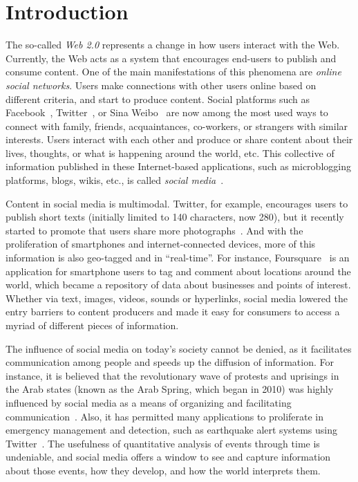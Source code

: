 \chapter{Introduction}


The so-called {\em Web 2.0} represents a change in how users interact with the
Web.
%
Currently, the Web acts as a system that encourages end-users to publish and
consume content. 
%
One of the main manifestations of this phenomena are {\em online social
networks}.
%
Users make connections with other users online based on different criteria, and
start to produce content.
%
Social platforms such as Facebook~\cite{facebook}, Twitter~\cite{twitter},
or Sina Weibo~\cite{weibo} are now among the most used ways to connect with
family, friends, acquaintances, co-workers, or strangers with similar interests.
%
Users interact with each other and produce or share content about their lives,
thoughts, or what is happening around the world, etc.    
%
This collective of information published in these Internet-based applications,
such as microblogging platforms, blogs, wikis, etc., is called {\em
social media}~\cite{kaplan2010users}.


Content in social media is multimodal. 
%
Twitter, for example, encourages users to publish short texts (initially limited
to 140 characters, now 280), but it recently started to promote that users share
more photographs~\cite{brown_2019}.
%  
And with the proliferation of smartphones and internet-connected devices, more
of this information is also geo-tagged and in ``real-time''. 
%
For instance, Foursquare~\cite{foursquare} is an application for smartphone
users to tag and comment about locations around the world, which became a
repository of data about businesses and points of interest.
%
Whether via text, images, videos, sounds or hyperlinks, social media lowered the
entry barriers to content producers and made it easy for consumers to access a
myriad of different pieces of information.





The influence of social media on today's society cannot be denied, as it
facilitates co\-mmu\-nication among people and speeds up the diffusion of
information. 
%
For instance, it is believed that the revolutionary wave of protests and
uprisings in the Arab states (known as the Arab Spring, which began in 2010) was
highly influenced by social media as a means of organizing and facilitating
communication~\cite{howard2011opening}. 
%
Also, it has permitted many applications to proliferate in emergency management
and detection, such as earthquake alert systems using
Twitter~\cite{Sakaki2010,Sakaki:Tweet:2013,Sarmiento:2018:DDE:3201064.3201077,Mendoza2019}.
%
The usefulness of quantitative analysis of events through time is undeniable, and
social media offers a window to see and capture information about those events,
how they develop, and how the world interprets them.\\

